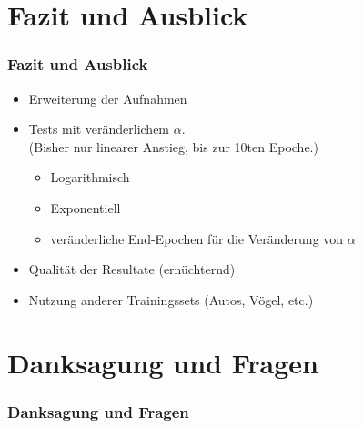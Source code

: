 \documentclass{beamer}
\begin{document}
\section{Fazit und Ausblick}
\begin{frame}
\frametitle{Fazit und Ausblick}
\begin{itemize}
    \item Erweiterung der Aufnahmen
    \item Tests mit veränderlichem $\alpha$. \\
    \small{(Bisher nur linearer Anstieg, bis zur 10ten Epoche.)}
    \begin{itemize}
        \item Logarithmisch
        \item Exponentiell
        \item veränderliche End-Epochen für die Veränderung von $\alpha$
    \end{itemize}
    \item Qualität der Resultate (ernüchternd)
    \item Nutzung anderer Trainingssets (Autos, Vögel, etc.)
\end{itemize}

\end{frame}\section{Danksagung und Fragen}
\begin{frame}
\frametitle{Danksagung und Fragen}

\end{frame}
\end{document}
